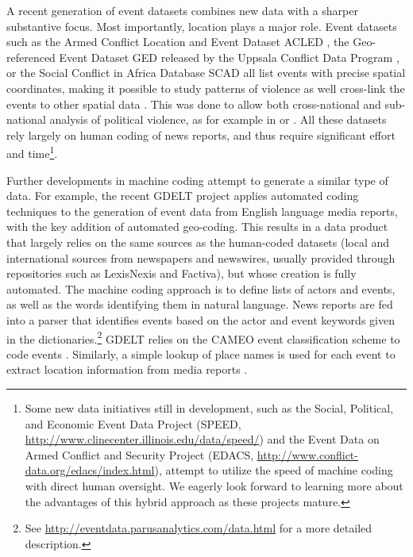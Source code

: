 \documentclass[hidelinks]{article}
\begin{document}
A recent generation of event datasets combines new data with a sharper substantive focus. Most importantly, location plays a major role. Event datasets such as the Armed Conflict Location and Event Dataset ACLED \citep{raleigh10acled}, the Geo-referenced Event Dataset GED released by the Uppsala Conflict Data Program \citep{sundberg13introducing}, or the Social Conflict in Africa Database SCAD \citep{salehyan12social} all list events with precise spatial coordinates, making it possible to study patterns of violence as well cross-link the events to other spatial data \citep{gleditsch12richardson}. This was done to allow both cross-national and sub-national analysis of political violence, as for example in \citet{raleigh09population} or \citet{weidmann10predicting}. All these datasets rely largely on human coding of news reports, and thus require significant effort and time\footnote{Some new data initiatives still in development, such as the Social, Political, and Economic Event Data Project (SPEED, \url{http://www.clinecenter.illinois.edu/data/speed/}) and the Event Data on Armed Conflict and Security Project (EDACS, \url{http://www.conflict-data.org/edacs/index.html}), attempt to utilize the speed of machine coding with direct human oversight. We eagerly look forward to learning more about the advantages of this hybrid approach as these projects mature.}.

Further developments in machine coding attempt to generate a similar type of data. For example, the recent GDELT project applies automated coding techniques to the generation of event data from English language media reports, with the key addition of automated geo-coding. This results in a data product that largely relies on the same sources as the human-coded datasets (local and international sources from newspapers and newswires, usually provided through repositories such as LexisNexis and Factiva), but whose creation is fully automated. The machine coding approach is to define lists of actors and events, as well as the words identifying them in natural language. News reports are fed into a parser that identifies events based on the actor and event keywords given in the dictionaries.\footnote{See \url{http://eventdata.parusanalytics.com/data.html} for a more detailed description.} GDELT relies on the CAMEO event classification scheme to code events \citep{gerner02cameo}. Similarly, a simple lookup of place names is used for each event to extract location information from media reports \citep{leetaru13gdelt}. 
\end{document}
